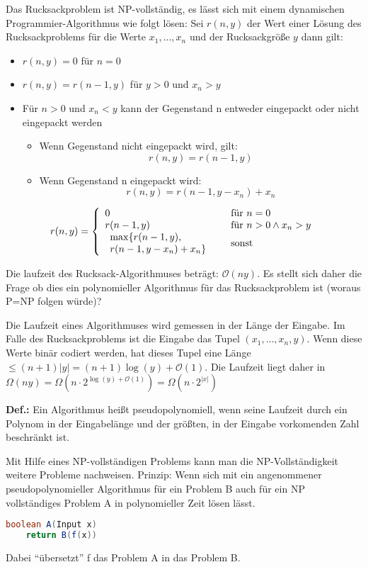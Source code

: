 Das Rucksackproblem ist NP-vollständig, es lässt sich mit einem dynamischen Pro\-gram\-mier-Algorithmus wie folgt lösen:
Sei \(r(n,y)\) der Wert einer Lösung des Rucksackproblems für die Werte \(x_{1}, \dots, x_{n}\) und der Rucksackgröße \(y\) dann gilt:
\begin{itemize}
	\item \(r(n,y) = 0\) für \(n=0\)
	\item \(r(n,y) = r(n-1,y)\) für \(y>0\) und \(x_{n} > y\)
	\item Für \(n > 0\) und \(x_{n} < y\) kann der Gegenstand n entweder eingepackt oder nicht eingepackt werden
		\begin{itemize}
			\item Wenn Gegenstand nicht eingepackt wird, gilt: \[r(n,y) = r(n-1,y)\]
			\item Wenn Gegenstand n eingepackt wird: \[r(n,y) = r(n-1,y-x_{n})+x_{n}\]
		\end{itemize}
\end{itemize}
 \[r(n,y) = \left\{
			\begin{array}{l l}
				0 				& \quad \text{für } n=0\\
				r(n-1,y) 		& \quad \text{für } n>0 \wedge x_{n} > y \\
				\begin{array}{l l}
					\max \{
						r(n-1,y),\\
						r(n-1,y-x_{n})+x_{n}
					\}
				\end{array} & \quad \text{sonst}
		\end{array} \right.\]

Die laufzeit des Rucksack-Algorithmuses beträgt: \(\mathcal{O}(ny)\).
Es stellt sich daher die Frage ob dies ein polynomieller Algorithmus für das Rucksackproblem ist (woraus P=NP folgen würde)?

Die Laufzeit eines Algorithmuses wird gemessen in der Länge der Eingabe.
Im Falle des Rucksackproblems ist die Eingabe das Tupel \((x_{1}, \dots, x_{n}, y)\).
Wenn diese Werte binär codiert werden, hat dieses Tupel eine Länge \(\leq (n+1)|y| = (n+1) \log(y)+\mathcal{O}(1)\).
Die Laufzeit liegt daher in \(\Omega(ny) = \Omega(n \cdot 2^{\log(y)+\mathcal{O}(1)}) = \Omega(n \cdot 2^{|x|})\)
\begin{shaded}
	\noindent
	\textbf{Def.:} Ein Algorithmus heißt pseudopolynomiell, wenn seine Laufzeit durch ein Polynom in der Eingabelänge und der größten, in der Eingabe vorkomenden Zahl beschränkt ist.
\end{shaded}
Mit Hilfe eines NP-vollständigen Problems kann man die NP-Vollständigkeit weitere Probleme nachweisen.
Prinzip: Wenn sich mit ein angenommener pseudopolynomieller Algorithmus für ein Problem B auch für ein NP vollständiges Problem A in polynomieller Zeit lösen lässt.
\newpage
\begin{lstlisting}[language=java, caption={Pseudocode des Prinzips}]
boolean A(Input x)
	return B(f(x))
\end{lstlisting}
Dabei ``übersetzt'' f das Problem A in das Problem B.

